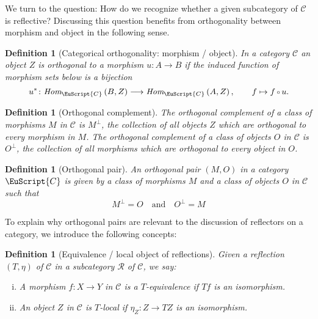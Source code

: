 \documentclass [12pt,oneside]{book}%
\theoremstyle{captionstyle}  %
\newtheorem{definition}[theorem]{Definition}
\newcommand{\Defn}[1]{\emph{#1}}
\newcommand{\from}{\colon}				%
\newcommand{\Comp}{\raisebox{0.1ex}{\ensuremath{\,\scriptstyle{\circ}}\,}}
\newcommand{\HomIn}[3]{\textit{Hom}_{#1}\left(#2,#3\right)}
\newcommand{\AdjUnit}{\eta}										     %
\newcommand{\AdjUnitOn}[1]{\eta_{#1}}					     %
\newcommand{\Ctgry}[1]{\EuScript{#1}}					%
\begin{document}
We turn to the question: How do we recognize whether a given subcategory of $\mathcal{C}$ is reflective? Discussing this question benefits from orthogonality between morphism and object in the following sense.

\begin{definition}[Categorical orthogonality: morphism / object]
    \label{def:Orthogonality-Morphism/Object}
    In a category $\mathcal{C}$ an object $Z$ is \Defn{orthogonal} to a morphism $u\from A\to B$ if the induced function of morphism sets below is a bijection
    \begin{equation*}
        u^*\from\HomIn{\Ctgry{C}}{B}{Z} \longrightarrow \HomIn{\Ctgry{C}}{A}{Z},\qquad f \mapsto f\Comp u.
    \end{equation*}
\end{definition}

\begin{definition}[Orthogonal complement]
    \label{def:OrthogonalComplement}
    The \Defn{orthogonal complement of a class of morphisms} $M$ in $\mathcal{C}$ is $M^{\bot}$, the collection of all objects $Z$ which are orthogonal to every morphism in $M$. The \Defn{orthogonal complement of a class of objects} $O$ in $\mathcal{C}$ is $O^{\bot}$, the collection of all morphisms which are orthogonal to every object in $O$. %
\end{definition}

\begin{definition}[Orthogonal pair]
    \label{def:OrthogonalPair}
    An \Defn{orthogonal pair} $(M,O)$ in a category $\EuScript{C}$ is given by a class of morphisms $M$ and a class of objects $O$ in $\mathcal{C}$ such that %
    \begin{equation*}
        M^{\bot}=O \quad\text{and}\quad O^{\bot}=M
    \end{equation*}
\end{definition}

To explain why orthogonal pairs are relevant to the discussion of reflectors on a category, we introduce the following concepts:

\begin{definition}[Equivalence / local object of reflections]
    \label{def:Equivalence/LocalObject}
    Given a reflection $(T,\AdjUnit)$ of $\mathcal{C}$ in a subcategory $\mathcal{R}$ of $\mathcal{C}$, we say:
    \begin{enumerate}[(i)]
        \item A morphism $f\from X\to Y$ in $\mathcal{C}$ is a \Defn{$T$-equivalence} if $Tf$ is an isomorphism. %
        \item An object $Z$ in $\mathcal{C}$ is \Defn{$T$-local} if $\AdjUnitOn{Z}\from Z\to TZ$ is an isomorphism. %
    \end{enumerate}
\end{definition}
\end{document}
